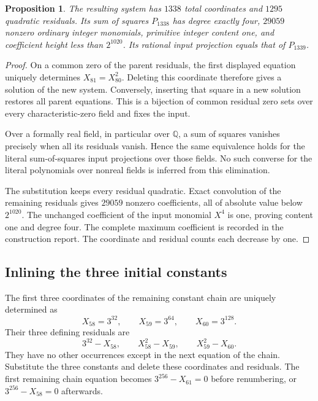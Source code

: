 \documentclass[11pt]{article}
\newtheorem{proposition}[theorem]{Proposition}
\theoremstyle{definition}
\begin{document}
\begin{proposition}\label{prop:p3-small-coefficient-1338}
The resulting system has $1338$ total coordinates and $1295$
quadratic residuals.  Its sum of squares $P_{1338}$ has degree exactly
four, $29059$ nonzero ordinary integer monomials, primitive integer
content one, and coefficient height less than $2^{1020}$.
Its rational input projection equals that of $P_{1339}$.
\end{proposition}
\begin{proof}
On a common zero of the parent residuals, the first displayed equation
uniquely determines $X_{81}=X_{80}^2$.  Deleting this coordinate
therefore gives a solution of the new system.  Conversely, inserting
that square in a new solution restores all parent equations.  This
is a bijection of common residual zero sets over every
characteristic-zero field and fixes the input.

Over a formally real field, in particular over $\mathbb Q$, a sum
of squares vanishes precisely when all its residuals vanish.  Hence
the same equivalence holds for the literal sum-of-squares input
projections over those fields.  No such converse for the literal
polynomials over nonreal fields is inferred from this elimination.

The substitution keeps every residual quadratic.  Exact convolution
of the remaining residuals gives $29059$ nonzero coefficients, all
of absolute value below $2^{1020}$.  The unchanged coefficient of
the input monomial $X^4$ is one, proving content one and degree four.
The complete maximum coefficient is recorded in the construction
report.  The coordinate and residual counts each decrease by one.
\end{proof}

\subsection{Inlining the three initial constants}

The first three coordinates of the remaining constant chain are
uniquely determined as
\[
                  X_{58}=3^{32},\qquad X_{59}=3^{64},
                  \qquad X_{60}=3^{128}.
\]
Their three defining residuals are
\[
       3^{32}-X_{58},\qquad X_{58}^2-X_{59},
       \qquad X_{59}^2-X_{60}.
\]
They have no other occurrences except in the next equation of
the chain.  Substitute the three constants and delete these
coordinates and residuals.  The first remaining chain equation
becomes $3^{256}-X_{61}=0$ before renumbering, or
$3^{256}-X_{58}=0$ afterwards.
\end{document}
